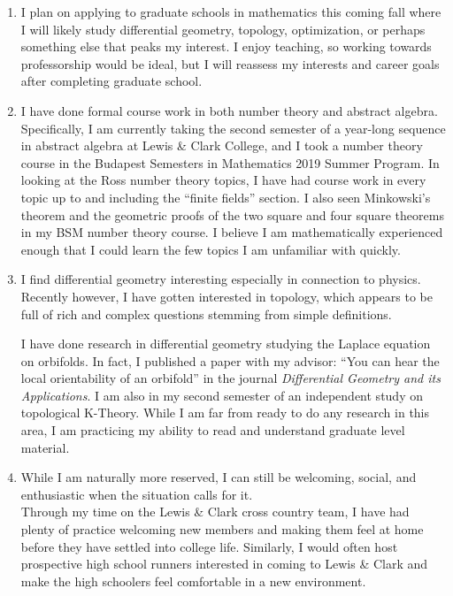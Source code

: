 \documentclass[12]{amsart}
\begin{document}
\begin{enumerate}
        \item I plan on applying to graduate schools in mathematics this coming fall where I will likely study differential geometry, topology, optimization, or perhaps something else that peaks my interest. I enjoy teaching, so working towards professorship would be ideal, but I will reassess my interests and career goals after completing graduate school. \\

    \item I have done formal course work in both number theory and abstract
        algebra. Specifically, I am currently taking the second semester of a
        year-long sequence in abstract algebra at Lewis \& Clark College, and        I took a number theory course in the Budapest Semesters in
        Mathematics 2019 Summer Program. In looking at the Ross number theory topics, I have had course work in every topic up to and including the ``finite fields'' section. I also seen Minkowski's theorem and the geometric proofs of the two square and four square theorems in my BSM number theory course. I believe I am mathematically experienced enough that I could learn the few topics I am unfamiliar with quickly.\\

    \item 
        I find differential geometry interesting especially in connection to physics. Recently however, I have gotten interested in topology, which appears to be full of rich and complex questions stemming from simple definitions.

        I have done research in differential geometry studying the Laplace equation on orbifolds. In fact, I published a paper with my advisor: ``You can hear the local orientability of an orbifold'' in the journal \textit{Differential Geometry and its Applications}. I am also in my second semester of an independent study on topological K-Theory. While I am far from ready to do any research in this area, I am practicing my ability to read and understand graduate level material.\\

    \item While I am naturally more reserved, I can still be welcoming, social,
        and enthusiastic when the situation calls for it. \\
        Through my time on
        the Lewis \& Clark cross country team, I have had plenty of practice
        welcoming new members and making them feel at home before they have
        settled into college life. Similarly, I would often host prospective high school runners interested in coming to Lewis \& Clark and make the high schoolers feel comfortable in a new environment.


\end{enumerate}
\end{document}
